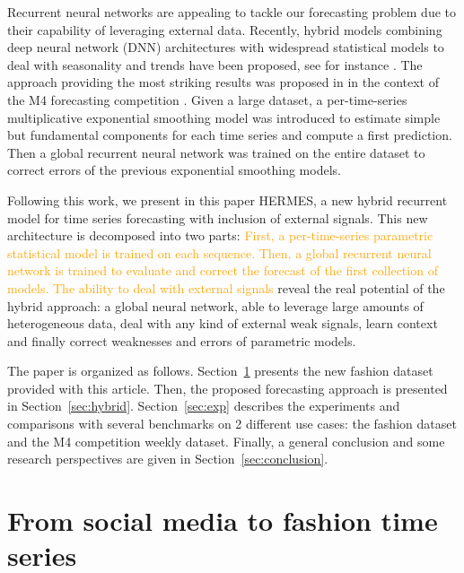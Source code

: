 \documentclass[10pt]{article} %
\begin{document}
Recurrent neural networks are appealing to tackle our forecasting problem due to their capability of leveraging external data.  Recently, hybrid models combining deep neural network (DNN) architectures with widespread statistical models to deal with seasonality and trends have been proposed, see for instance  \citet{zhang2003,jianwei2019,bandara2020}. The approach providing the most striking results was proposed in  \citet{smyl2020} in the context of the M4 forecasting competition \citep{makridakis2020}.  Given a large dataset, a per-time-series multiplicative exponential smoothing model was introduced to estimate simple but fundamental components for each time series and compute a first prediction. Then a global recurrent neural network was trained on the entire dataset to correct errors of the previous exponential smoothing models. 

Following this work, we present in this paper HERMES, a new hybrid recurrent model for time series forecasting with inclusion of external signals. This new architecture is decomposed  into two parts: \textcolor{orange}{First, a per-time-series parametric statistical model is trained on each sequence. Then, a global recurrent neural network is trained to evaluate and correct the forecast of the first collection of models. The ability to deal with external signals} reveal the real potential of the hybrid approach: a global neural network, able to leverage large amounts of heterogeneous data, deal with any kind of external weak signals, learn context and finally correct weaknesses and errors of parametric models.

The paper is organized as follows. Section~\ref{sec:dataset} presents the new fashion dataset provided with this article. Then, the proposed forecasting approach is presented in Section~\ref{sec:hybrid}. Section~\ref{sec:exp} describes the experiments and comparisons with several benchmarks on 2 different use cases: the fashion dataset and the M4 competition weekly dataset. Finally, a general conclusion and some research perspectives are given in  Section~\ref{sec:conclusion}.

\section{From social media to fashion time series}
\label{sec:dataset}

\end{document}
